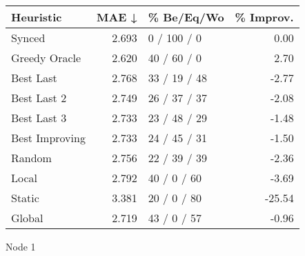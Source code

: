 \begin{tabular}{lrlr}
\toprule
\textbf{Heuristic} & \textbf{MAE ↓} & \textbf{\% Be/Eq/Wo} & \textbf{\% Improv.} \\
\midrule
            Synced &          2.693 &          0 / 100 / 0 &                0.00 \\
     Greedy Oracle &          2.620 &          40 / 60 / 0 &                2.70 \\
         Best Last &          2.768 &         33 / 19 / 48 &               -2.77 \\
       Best Last 2 &          2.749 &         26 / 37 / 37 &               -2.08 \\
       Best Last 3 &          2.733 &         23 / 48 / 29 &               -1.48 \\
    Best Improving &          2.733 &         24 / 45 / 31 &               -1.50 \\
            Random &          2.756 &         22 / 39 / 39 &               -2.36 \\
             Local &          2.792 &          40 / 0 / 60 &               -3.69 \\
            Static &          3.381 &          20 / 0 / 80 &              -25.54 \\
            Global &          2.719 &          43 / 0 / 57 &               -0.96 \\
\bottomrule
\end{tabular}
\caption{Node 1}
\label{tab:hr_iid_lr05_le1_bs2_1}
